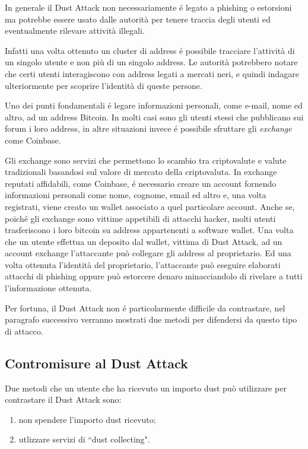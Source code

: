 In generale il Dust Attack non necessariamente é legato a phishing o estorsioni ma potrebbe essere usato dalle autorità per tenere traccia degli utenti ed eventualmente rilevare attività illegali.

Infatti una volta ottenuto un cluster di address é possibile tracciare l'attività di un singolo utente e non più di un singolo address. Le autorità potrebbero notare che certi utenti interagiscono con address legati a mercati neri, e quindi indagare ulteriormente per scoprire l'identità di queste persone.

Uno dei punti fondamentali é legare informazioni personali, come e-mail, nome ed altro, ad un address Bitcoin. In molti casi sono gli utenti stessi che pubblicano sui forum i loro address, in altre situazioni invece é possibile sfruttare gli \emph{exchange} come Coinbase.

Gli exchange sono servizi che permettono lo scambio tra criptovalute e valute tradizionali basandosi sul valore di mercato della criptovaluta. In exchange reputati affidabili, come Coinbase, é necessario creare un account fornendo informazioni personali come nome, cognome, email ed altro e, una volta registrati, viene creato un wallet associato a quel particolare account. Anche se, poiché gli exchange sono vittime appetibili di attacchi hacker, molti utenti trasferiscono i loro bitcoin su address appartenenti a software wallet. Una volta che un utente effettua un deposito dal wallet, vittima di Dust Attack, ad un account exchange l'attaccante può collegare gli address al proprietario. Ed una volta ottenuta l'identità del proprietario, l'attaccante può eseguire elaborati attacchi di phishing oppure può estorcere denaro minacciandolo di rivelare a tutti l'informazione ottenuta. 

Per fortuna, il Dust Attack non é particolarmente difficile da contrastare, nel paragrafo successivo verranno mostrati due metodi per difendersi da questo tipo di attacco.

\subsection{Contromisure al Dust Attack}

Due metodi che un utente che ha ricevuto un importo dust può utilizzare per contrastare il Dust Attack sono:
    \begin{enumerate}
        \item non spendere l'importo dust ricevuto; 
        \item utlizzare servizi di ``dust collecting". 
    \end{enumerate}
    
